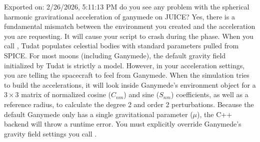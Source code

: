 \markdownRendererDocumentBegin
\markdownRendererSectionBegin
{}\markdownRendererInterblockSeparator
{}\markdownRendererBlockQuoteBegin
Exported on: 2/26/2026, 5:11:13 PM
\markdownRendererBlockQuoteEnd \markdownRendererInterblockSeparator
{}\markdownRendererThematicBreak{}\markdownRendererInterblockSeparator
{}\markdownRendererSectionBegin
{}\markdownRendererInterblockSeparator
{}do you see any problem with the spherical harmonic gravirational acceleration of ganymede on JUICE?\markdownRendererInterblockSeparator
{}
\markdownRendererSectionEnd \markdownRendererSectionBegin
{}\markdownRendererInterblockSeparator
{}Yes, there is a fundamental mismatch between the environment you created and the acceleration you are requesting. It will cause your script to crash during the  phase.\markdownRendererInterblockSeparator
{}\markdownRendererSectionBegin
{}\markdownRendererInterblockSeparator
{}When you call , Tudat populates celestial bodies with standard parameters pulled from SPICE. For most moons (including Ganymede), the default gravity field initialized by Tudat is strictly a  model.\markdownRendererInterblockSeparator
{}However, in your acceleration settings, you are telling the spacecraft to feel  from Ganymede.\markdownRendererInterblockSeparator
{}When the simulation tries to build the accelerations, it will look inside Ganymede's environment object for a $3 \times 3$ matrix of normalized cosine ($C_{nm}$) and sine ($S_{nm}$) coefficients, as well as a reference radius, to calculate the degree 2 and order 2 perturbations. Because the default Ganymede only has a single gravitational parameter ($\mu$), the C++ backend will throw a runtime error.\markdownRendererInterblockSeparator
{}
\markdownRendererSectionEnd \markdownRendererSectionBegin
{}\markdownRendererInterblockSeparator
{}You must explicitly override Ganymede's gravity field settings  you call .\markdownRendererInterblockSeparator
